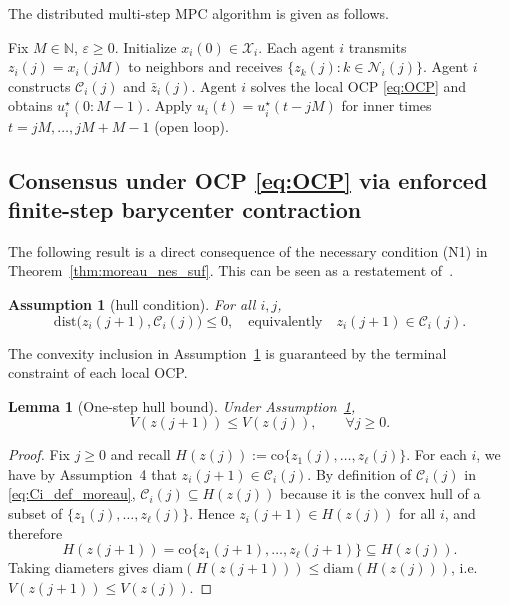 \documentclass[12pt,draftcls,onecolumn]{IEEEtran}
\newtheorem{lemma}{Lemma}
\newtheorem{assumption}{Assumption}
\newcommand{\X}{\ensuremath{\mathcal X}}
\def\Cij{\mathcal{C}_i (j)}
\def\dist{\mathrm{dist}}
\def\diam{\mathrm{diam}}
\def\co{\mathrm{co}}
\begin{document}
The distributed multi-step MPC algorithm is given as follows.
\begin{algorithm}[ht]
\caption{Distributed MPC routine}
\label{alg:dmproutine}
\begin{algorithmic}[1]
\State Fix $M\in\mathbb{N}$, $\varepsilon\ge 0$. Initialize $x_i(0)\in \X_i$.
  \State Each agent $i$ transmits $z_i(j)=x_i(jM)$ to neighbors and receives $\{z_k(j):k\in\mathcal{N}_i(j)\}$.
  \State Agent $i$ constructs $\mathcal{C}_i(j)$ and $\bar z_i(j)$.
  \State Agent $i$ solves the local OCP \eqref{eq:OCP} and obtains $u_i^\star(0{:}M-1)$.
  \State Apply $u_i(t)=u_i^\star(t-jM)$ for inner times $t=jM,\dots,jM+M-1$ (open loop).
\EndFor
\end{algorithmic}
\end{algorithm}
\subsection{Consensus under OCP \eqref{eq:OCP} via enforced finite-step barycenter contraction}
\label{subsec:asymp_consensus_ocp14}

The following result is a direct consequence of the necessary condition (N1) in Theorem~\ref{thm:moreau_nes_suf}.
This can be seen as a restatement of~\cite[Lemma~1]{Moreau.2005}.

\begin{assumption}[hull condition]\label{ass:eps_hull}
For all $i,j$,
\begin{equation}\label{eq:eps_hull}
\dist\big(z_i(j+1),\mathcal{C}_i(j)\big)\le 0,
\quad\text{equivalently}\quad z_i(j+1)\in \mathcal{C}_i(j) .
\end{equation}
\end{assumption}
The convexity inclusion in Assumption~\ref{ass:eps_hull} is guaranteed by the terminal constraint of each local OCP.
\begin{lemma}[One-step hull bound]\label{lem:one_step}
Under Assumption~\ref{ass:eps_hull},
\begin{equation}\label{eq:one_step_V}
V(z(j+1))\le V(z(j)) ,\qquad \forall j  \geq 0.
\end{equation}
\end{lemma}
\begin{proof}
Fix $j\ge0$ and recall $H(z(j)):=\co\{z_1(j),\dots,z_\ell(j)\}$.
For each $i$, we have by Assumption~4 that $z_i(j{+}1)\in \Cij$.
By definition of $\Cij$ in \eqref{eq:Ci_def_moreau}, $\Cij\subseteq H(z(j))$ because it is the convex hull of a subset
of $\{z_1(j),\dots,z_\ell(j)\}$.
Hence $z_i(j+1)\in H(z(j))$ for all $i$, and therefore
\[
H(z(j+1))=\co\{z_1(j{+}1),\dots,z_\ell(j{+}1)\}\subseteq H(z(j)).
\]
Taking diameters gives $\diam(H(z(j+1)))\le \diam(H(z(j)))$, i.e. $V(z(j+1))\le V(z(j))$.
\end{proof}
\end{document}
